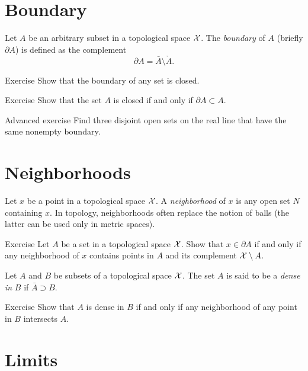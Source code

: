 \section{Boundary}

Let $A$ be an arbitrary subset in a topological space $\mathcal{X}$.
The \emph{boundary} of $A$ (briefly $\partial A$) is defined as the complement 
\[\partial A=\bar A\setminus \mathring A.\]

\begin{thm}{Exercise}\label{ex:bry-closed}
Show that the boundary of any set is closed.
\end{thm}

\begin{thm}{Exercise}\label{ex:bry<closure}
Show that the set $A$ is closed if and only if $\partial A\subset A$.
\end{thm}

\begin{thm}{Advanced exercise}\label{ex:3=bry}
Find three disjoint open sets on the real line 
that have the same nonempty boundary.
\end{thm}

\section{Neighborhoods}

Let $x$ be a point in a topological space $\mathcal{X}$.
A \emph{neighborhood} of $x$ is any open set $N$ containing $x$.
In topology, neighborhoods often replace the notion of balls (the latter can be used only in metric spaces).  


\begin{thm}{Exercise}\label{ex:bry-nbhd}
Let $A$ be a set in a topological space $\mathcal{X}$.
Show that $x\in \partial A$ if and only if any neighborhood of $x$ contains points in $A$ and its complement $\mathcal{X}\setminus A$. 
\end{thm}

Let $A$ and $B$ be subsets of a topological space $\mathcal{X}$.
The set $A$ is said to be a \emph{dense in}  $B$ if $\bar A\supset B$.

\begin{thm}{Exercise}\label{ex:dense-nbhd} 
Show that $A$ is dense in $B$ if and only if any neighborhood of any point in $B$ intersects $A$.
\end{thm}

\section{Limits}

